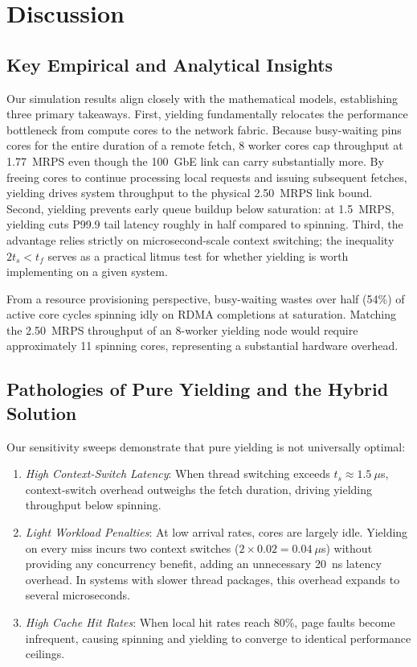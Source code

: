 \section{Discussion}
\label{sec:discussion}

\subsection{Key Empirical and Analytical Insights}
Our simulation results align closely with the mathematical models, establishing three primary takeaways. First, yielding fundamentally relocates the performance bottleneck from compute cores to the network fabric. Because busy-waiting pins cores for the entire duration of a remote fetch, 8 worker cores cap throughput at 1.77~MRPS even though the 100~GbE link can carry substantially more. By freeing cores to continue processing local requests and issuing subsequent fetches, yielding drives system throughput to the physical 2.50~MRPS link bound. Second, yielding prevents early queue buildup below saturation: at 1.5~MRPS, yielding cuts P99.9 tail latency roughly in half compared to spinning. Third, the advantage relies strictly on microsecond-scale context switching; the inequality $2t_s < t_f$ serves as a practical litmus test for whether yielding is worth implementing on a given system.

From a resource provisioning perspective, busy-waiting wastes over half (54\%) of active core cycles spinning idly on RDMA completions at saturation. Matching the 2.50~MRPS throughput of an 8-worker yielding node would require approximately 11 spinning cores, representing a substantial hardware overhead.

\subsection{Pathologies of Pure Yielding and the Hybrid Solution}
Our sensitivity sweeps demonstrate that pure yielding is not universally optimal:
\begin{enumerate}
\item \emph{High Context-Switch Latency}: When thread switching exceeds $t_s \approx 1.5~\mu$s, context-switch overhead outweighs the fetch duration, driving yielding throughput below spinning.
\item \emph{Light Workload Penalties}: At low arrival rates, cores are largely idle. Yielding on every miss incurs two context switches ($2 \times 0.02 = 0.04~\mu$s) without providing any concurrency benefit, adding an unnecessary 20~ns latency overhead. In systems with slower thread packages, this overhead expands to several microseconds.
\item \emph{High Cache Hit Rates}: When local hit rates reach 80\%, page faults become infrequent, causing spinning and yielding to converge to identical performance ceilings.
\end{enumerate}

